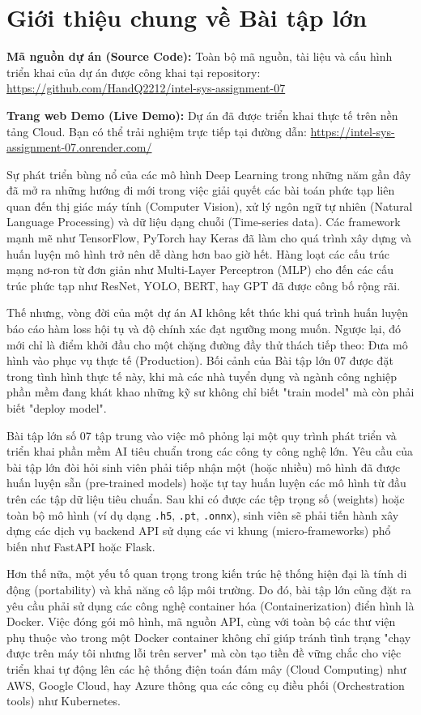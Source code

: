 \documentclass[12pt,a4paper]{article}
\begin{document}
\newpage
\section{Giới thiệu chung về Bài tập lớn}

\textbf{Mã nguồn dự án (Source Code):} Toàn bộ mã nguồn, tài liệu và cấu hình triển khai của dự án được công khai tại repository: \url{https://github.com/HandQ2212/intel-sys-assignment-07}

\textbf{Trang web Demo (Live Demo):} Dự án đã được triển khai thực tế trên nền tảng Cloud. Bạn có thể trải nghiệm trực tiếp tại đường dẫn: \url{https://intel-sys-assignment-07.onrender.com/}


Sự phát triển bùng nổ của các mô hình Deep Learning trong những năm gần đây đã mở ra những hướng đi mới trong việc giải quyết các bài toán phức tạp liên quan đến thị giác máy tính (Computer Vision), xử lý ngôn ngữ tự nhiên (Natural Language Processing) và dữ liệu dạng chuỗi (Time-series data). Các framework mạnh mẽ như TensorFlow, PyTorch hay Keras đã làm cho quá trình xây dựng và huấn luyện mô hình trở nên dễ dàng hơn bao giờ hết. Hàng loạt các cấu trúc mạng nơ-ron từ đơn giản như Multi-Layer Perceptron (MLP) cho đến các cấu trúc phức tạp như ResNet, YOLO, BERT, hay GPT đã được công bố rộng rãi.

Thế nhưng, vòng đời của một dự án AI không kết thúc khi quá trình huấn luyện báo cáo hàm loss hội tụ và độ chính xác đạt ngưỡng mong muốn. Ngược lại, đó mới chỉ là điểm khởi đầu cho một chặng đường đầy thử thách tiếp theo: Đưa mô hình vào phục vụ thực tế (Production). Bối cảnh của Bài tập lớn 07 được đặt trong tình hình thực tế này, khi mà các nhà tuyển dụng và ngành công nghiệp phần mềm đang khát khao những kỹ sư không chỉ biết "train model" mà còn phải biết "deploy model". 

Bài tập lớn số 07 tập trung vào việc mô phỏng lại một quy trình phát triển và triển khai phần mềm AI tiêu chuẩn trong các công ty công nghệ lớn. Yêu cầu của bài tập lớn đòi hỏi sinh viên phải tiếp nhận một (hoặc nhiều) mô hình đã được huấn luyện sẵn (pre-trained models) hoặc tự tay huấn luyện các mô hình từ đầu trên các tập dữ liệu tiêu chuẩn. Sau khi có được các tệp trọng số (weights) hoặc toàn bộ mô hình (ví dụ dạng \texttt{.h5}, \texttt{.pt}, \texttt{.onnx}), sinh viên sẽ phải tiến hành xây dựng các dịch vụ backend API sử dụng các vi khung (micro-frameworks) phổ biến như FastAPI hoặc Flask. 

Hơn thế nữa, một yếu tố quan trọng trong kiến trúc hệ thống hiện đại là tính di động (portability) và khả năng cô lập môi trường. Do đó, bài tập lớn cũng đặt ra yêu cầu phải sử dụng các công nghệ container hóa (Containerization) điển hình là Docker. Việc đóng gói mô hình, mã nguồn API, cùng với toàn bộ các thư viện phụ thuộc vào trong một Docker container không chỉ giúp tránh tình trạng "chạy được trên máy tôi nhưng lỗi trên server" mà còn tạo tiền đề vững chắc cho việc triển khai tự động lên các hệ thống điện toán đám mây (Cloud Computing) như AWS, Google Cloud, hay Azure thông qua các công cụ điều phối (Orchestration tools) như Kubernetes.
\end{document}
